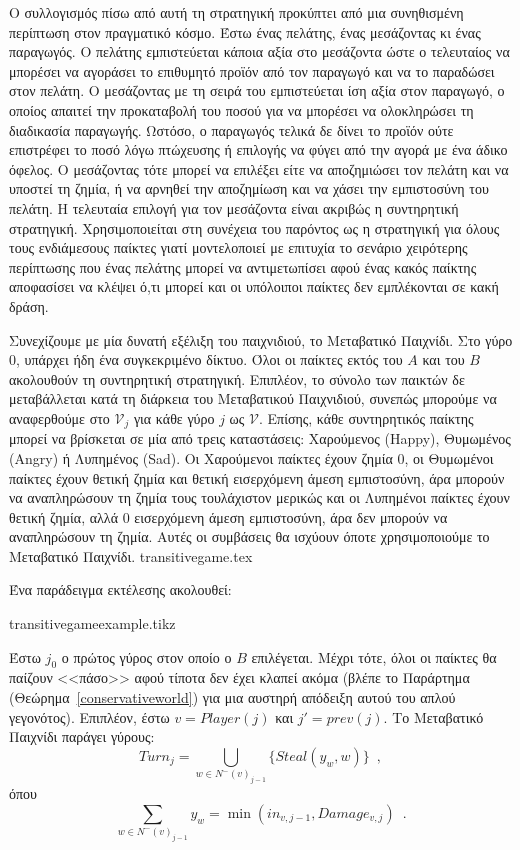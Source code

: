   Ο συλλογισμός πίσω από αυτή τη στρατηγική προκύπτει από μια συνηθισμένη περίπτωση στον πραγματικό κόσμο. Έστω ένας πελάτης,
  ένας μεσάζοντας κι ένας παραγωγός. Ο πελάτης εμπιστεύεται κάποια αξία στο μεσάζοντα ώστε ο τελευταίος να μπορέσει να
  αγοράσει το επιθυμητό προϊόν από τον παραγωγό και να το παραδώσει στον πελάτη. Ο μεσάζοντας με τη σειρά του εμπιστεύεται ίση
  αξία στον παραγωγό, ο οποίος απαιτεί την προκαταβολή του ποσού για να μπορέσει να ολοκληρώσει τη διαδικασία παραγωγής.
  Ωστόσο, ο παραγωγός τελικά δε δίνει το προϊόν ούτε επιστρέφει το ποσό λόγω πτώχευσης ή επιλογής να φύγει από την αγορά με
  ένα άδικο όφελος. Ο μεσάζοντας τότε μπορεί να επιλέξει είτε να αποζημιώσει τον πελάτη και να υποστεί τη ζημία, ή να αρνηθεί
  την αποζημίωση και να χάσει την εμπιστοσύνη του πελάτη. Η τελευταία επιλογή για τον μεσάζοντα είναι ακριβώς η συντηρητική
  στρατηγική. Χρησιμοποιείται στη συνέχεια του παρόντος ως η στρατηγική για όλους τους ενδιάμεσους παίκτες γιατί μοντελοποιεί
  με επιτυχία το σενάριο χειρότερης περίπτωσης που ένας πελάτης μπορεί να αντιμετωπίσει αφού ένας κακός παίκτης αποφασίσει να
  κλέψει ό,τι μπορεί και οι υπόλοιποι παίκτες δεν εμπλέκονται σε κακή δράση.

  Συνεχίζουμε με μία δυνατή εξέλιξη του παιχνιδιού, το Μεταβατικό Παιχνίδι. Στο γύρο 0, υπάρχει ήδη ένα συγκεκριμένο δίκτυο.
  Όλοι οι παίκτες εκτός του $A$ και του $B$ ακολουθούν τη συντηρητική στρατηγική. Επιπλέον, το σύνολο των παικτών δε
  μεταβάλλεται κατά τη διάρκεια του Μεταβατικού Παιχνιδιού, συνεπώς μπορούμε να αναφερθούμε στο $\mathcal{V}_j$ για κάθε γύρο
  $j$ ως $\mathcal{V}$. Επίσης, κάθε συντηρητικός παίκτης μπορεί να βρίσκεται σε μία από τρεις καταστάσεις: Χαρούμενος
  (\textlatin{Happy}), Θυμωμένος (\textlatin{Angry}) ή Λυπημένος (\textlatin{Sad}). Οι Χαρούμενοι παίκτες έχουν ζημία 0, οι
  Θυμωμένοι παίκτες έχουν θετική ζημία και θετική εισερχόμενη άμεση εμπιστοσύνη, άρα μπορούν να αναπληρώσουν τη ζημία τους
  τουλάχιστον μερικώς και οι Λυπημένοι παίκτες έχουν θετική ζημία, αλλά 0 εισερχόμενη άμεση εμπιστοσύνη, άρα δεν μπορούν να
  αναπληρώσουν τη ζημία. Αυτές οι συμβάσεις θα ισχύουν όποτε χρησιμοποιούμε το Μεταβατικό Παιχνίδι.
  {transitivegame.tex}

  Ένα παράδειγμα εκτέλεσης ακολουθεί:

  {transitivegameexample.tikz}

  Έστω $j_0$ ο πρώτος γύρος στον οποίο ο $B$ επιλέγεται. Μέχρι τότε, όλοι οι παίκτες θα παίζουν <<πάσο>> αφού τίποτα δεν έχει
  κλαπεί ακόμα (βλέπε το Παράρτημα (Θεώρημα~\ref{conservativeworld}) για μια αυστηρή απόδειξη αυτού του απλού γεγονότος).
  Επιπλέον, έστω $v = Player(j)$ και $j' = prev\left(j\right)$. Το Μεταβατικό Παιχνίδι παράγει γύρους:
  \begin{equation}
     Turn_j = \bigcup\limits_{w \in N^{-}\left(v\right)_{j-1}}\{Steal\left(y_w,w\right)\} \enspace,
  \end{equation}
  όπου
  \begin{equation*}
     \sum\limits_{w \in N^{-}\left(v\right)_{j-1}}y_w = \min\left(in_{v, j-1}, Damage_{v, j}\right) \enspace.
  \end{equation*}
 
